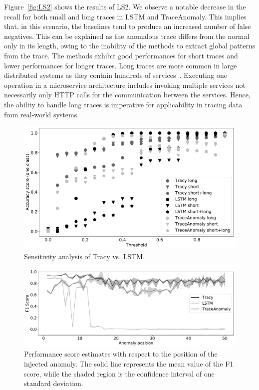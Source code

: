 Figure~\ref{fig:LS2} shows the results of LS2. We observe a notable decrease in the recall for both small and long traces in LSTM and TraceAnomaly. This implies that, in this scenario, the baselines tend to produce an increased number of false negatives. This can be explained as the anomalous trace differs from the normal only in its length, owing to the inability of the methods to extract global patterns from the trace. The methods exhibit good performances for short traces and lower performances for longer traces. Long traces are more common in large distributed systems as they contain hundreds of services~\cite{nedelkoski2019anomaly}. Executing one operation in a microservice architecture includes invoking multiple services not necessarily only HTTP calls for the communication between the services. Hence, the ability to handle long traces is imperative for applicability in tracing data from real-world systems. 


\begin{figure}[!t]
\centering
\includegraphics[width=1.0\columnwidth]{gfx/chap6/sensitivity_analysis.pdf}
\caption{Sensitivity analysis of Tracy vs. LSTM.}
\label{fig:3}
\end{figure}

\begin{figure}[!t]
\centering
\includegraphics[width=1.0\textwidth]{gfx/chap6/positiontracy.pdf}
\caption{Performance score estimates with respect to the position of the injected anomaly. The solid line represents the mean value of the F1 score, while the shaded region is the confidence interval of one standard deviation.}
\label{fig:8}
\end{figure}


